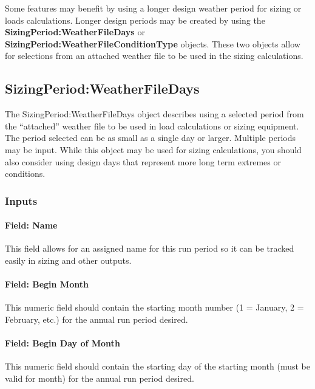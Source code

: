 Some features may benefit by using a longer design weather period for sizing or loads calculations. Longer design periods may be created by using the \textbf{Si\-zing\-Period:\-Weather\-File\-Days} or \textbf{Si\-zing\-Period:\-Weather\-File\-Con\-dition\-Type} objects. These two objects allow for selections from an attached weather file to be used in the sizing calculations.

\subsection{Sizing\-Period:\-Weather\-File\-Days}\label{sizingperiodweatherfiledays}

The Sizing\-Period:\-Weather\-File\-Days object describes using a selected period from the ``attached'' weather file to be used in load calculations or sizing equipment. The period selected can be as small as a single day or larger. Multiple periods may be input. While this object may be used for sizing calculations, you should also consider using design days that represent more long term extremes or conditions.

\subsubsection{Inputs}\label{inputs-2-022}

\paragraph{Field: Name}\label{field-name-2-021}

This field allows for an assigned name for this run period so it can be tracked easily in sizing and other outputs.

\paragraph{Field: Begin Month}\label{field-begin-month}

This numeric field should contain the starting month number (1 = January, 2 = February, etc.) for the annual run period desired.

\paragraph{Field: Begin Day of Month}\label{field-begin-day-of-month}

This numeric field should contain the starting day of the starting month (must be valid for month) for the annual run period desired.

